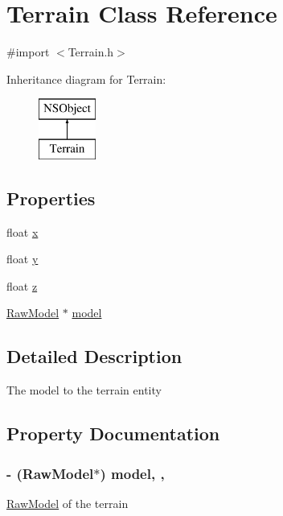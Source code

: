 \hypertarget{interface_terrain}{}\section{Terrain Class Reference}
\label{interface_terrain}


{\ttfamily \#import $<$Terrain.\+h$>$}

Inheritance diagram for Terrain\+:\begin{figure}[H]
\begin{center}
\leavevmode
\includegraphics[height=2.000000cm]{interface_terrain}
\end{center}
\end{figure}
\subsection*{Properties}
\begin{DoxyCompactItemize}
\item 
float \hyperlink{interface_terrain_a47761d42d9c6a4ffc7df3a5bf93b7ef2}{x}
\item 
float \hyperlink{interface_terrain_a6f91dd10a551c69436bee85b674bbdc4}{y}
\item 
float \hyperlink{interface_terrain_abf8b4e04a0571cd394dbef7e2b0f06ac}{z}
\item 
\hyperlink{interface_raw_model}{Raw\+Model} $\ast$ \hyperlink{interface_terrain_aeb3387c4f77d2b3403f8ad5e427018ac}{model}
\end{DoxyCompactItemize}


\subsection{Detailed Description}
The model to the terrain entity 

\subsection{Property Documentation}
\subsubsection[{\texorpdfstring{model}{model}}]{\setlength{\rightskip}{0pt plus 5cm}-\/ ({\bf Raw\+Model}$\ast$) model\hspace{0.3cm}{\ttfamily [read]}, {\ttfamily [atomic]}, {\ttfamily [assign]}}\hypertarget{interface_terrain_aeb3387c4f77d2b3403f8ad5e427018ac}{}\label{interface_terrain_aeb3387c4f77d2b3403f8ad5e427018ac}
\hyperlink{interface_raw_model}{Raw\+Model} of the terrain 
